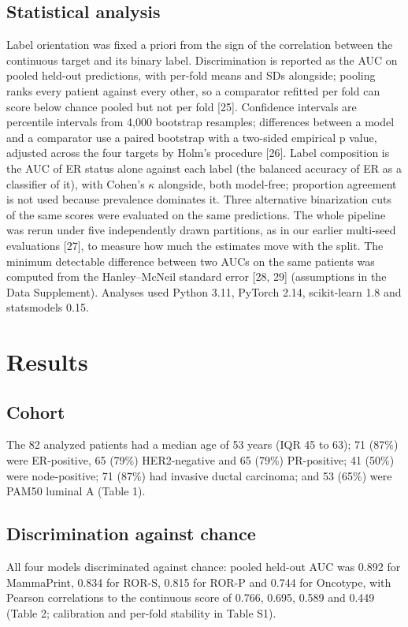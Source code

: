 \documentclass[11pt,a4paper]{article}
\begin{document}
\subsection{Statistical analysis}
Label orientation was fixed a priori from the sign of the correlation between the continuous target and its binary label. Discrimination is reported as the AUC on pooled held-out predictions, with per-fold means and SDs alongside; pooling ranks every patient against every other, so a comparator refitted per fold can score below chance pooled but not per fold [25]. Confidence intervals are percentile intervals from 4,000 bootstrap resamples; differences between a model and a comparator use a paired bootstrap with a two-sided empirical p value, adjusted across the four targets by Holm's procedure [26]. Label composition is the AUC of ER status alone against each label (the balanced accuracy of ER as a classifier of it), with Cohen's $\kappa$ alongside, both model-free; proportion agreement is not used because prevalence dominates it. Three alternative binarization cuts of the same scores were evaluated on the same predictions. The whole pipeline was rerun under five independently drawn partitions, as in our earlier multi-seed evaluations [27], to measure how much the estimates move with the split. The minimum detectable difference between two AUCs on the same patients was computed from the Hanley--McNeil standard error [28, 29] (assumptions in the Data Supplement). Analyses used Python 3.11, PyTorch 2.14, scikit-learn 1.8 and statsmodels 0.15.

\section{Results}
\subsection{Cohort}
The 82 analyzed patients had a median age of 53 years (IQR 45 to 63); 71 (87\%) were ER-positive, 65 (79\%) HER2-negative and 65 (79\%) PR-positive; 41 (50\%) were node-positive; 71 (87\%) had invasive ductal carcinoma; and 53 (65\%) were PAM50 luminal A (Table 1).

\subsection{Discrimination against chance}
All four models discriminated against chance: pooled held-out AUC was 0.892 for MammaPrint, 0.834 for ROR-S, 0.815 for ROR-P and 0.744 for Oncotype, with Pearson correlations to the continuous score of 0.766, 0.695, 0.589 and 0.449 (Table 2; calibration and per-fold stability in Table S1).
\end{document}
